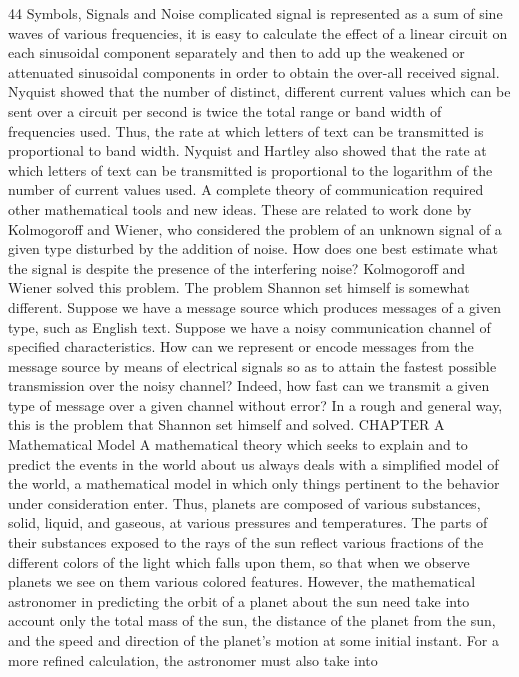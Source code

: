 44
Symbols, Signals and Noise
complicated signal is represented as a sum of sine waves of various
frequencies, it is easy to calculate the effect of a linear circuit on
each sinusoidal component separately and then to add up the
weakened or attenuated sinusoidal components in order to obtain
the over-all received signal.
Nyquist showed that the number of distinct, different current
values which can be sent over a circuit per second is twice the total
range or band width of frequencies used. Thus, the rate at which
letters of text can be transmitted is proportional to band width.
Nyquist and Hartley also showed that the rate at which letters of
text can be transmitted is proportional to the logarithm of the
number of current values used.
A complete theory of communication required other mathematical
tools and new ideas. These are related to work done by
Kolmogoroff and Wiener, who considered the problem of an
unknown signal of a given type disturbed by the addition of noise.
How does one best estimate what the signal is despite the presence
of the interfering noise? Kolmogoroff and Wiener solved this
problem.
The problem Shannon set himself is somewhat different. Suppose
we have a message source which produces messages of a given type,
such as English text. Suppose we have a noisy communication
channel of specified characteristics. How can we represent or
encode messages from the message source by means of electrical
signals so as to attain the fastest possible transmission over the
noisy channel? Indeed, how fast can we transmit a given type of
message over a given channel without error? In a rough and general
way, this is the problem that Shannon set himself and solved.
CHAPTER A Mathematical
Model
A mathematical theory which seeks to explain and to predict
the events in the world about us always deals with a simplified
model of the world, a mathematical model in which only things
pertinent to the behavior under consideration enter.
Thus, planets are composed of various substances, solid, liquid,
and gaseous, at various pressures and temperatures. The parts of
their substances exposed to the rays of the sun reflect various
fractions of the different colors of the light which falls upon them,
so that when we observe planets we see on them various colored
features. However, the mathematical astronomer in predicting the
orbit of a planet about the sun need take into account only the total
mass of the sun, the distance of the planet from the sun, and the
speed and direction of the planet’s motion at some initial instant.
For a more refined calculation, the astronomer must also take into
